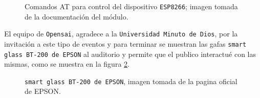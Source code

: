 \documentclass[jou]{apa6} %
\begin{document}
\begin{figure}[htb]
  \centering
\setlength\fboxsep{0pt}
\setlength\fboxrule{0.5pt}
  \caption{\footnotesize Comandos AT para control del dispositivo \texttt{ESP8266}; imagen tomada de la documentación del módulo.}
  \label{fig:AT}  
\end{figure}

El equipo de \texttt{Opensai}, agradece a la \texttt{Universidad Minuto de Dios}, por la invitación a este tipo de eventos y para terminar se muestran las gafas \texttt{smart glass BT-200 de EPSON} al auditorio y permite que el publico interactué con las mismas, como se muestra en la figura \ref{fig:gafas}.

\begin{figure}[htb]
  \centering
\setlength\fboxsep{0pt}
\setlength\fboxrule{0.5pt}
  \caption{\footnotesize \texttt{smart glass BT-200 de EPSON}, imagen tomada de la pagina oficial de EPSON. }
  \label{fig:gafas}  
\end{figure}






\end{document}
